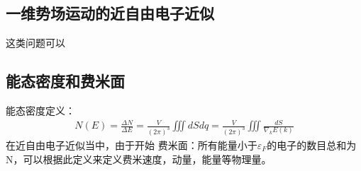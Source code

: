 \documentclass[UTF8]{article}
\numberwithin{equation}{section}
\begin{document}
\subsection{一维势场运动的近自由电子近似}
这类问题可以
\subsection{能态密度和费米面}
能态密度定义：
\begin{align*}
    N(E)=\frac{\Delta N}{\Delta E}=\frac{V}{(2\pi)^3}\iiint dSdq=\frac{V}{(2\pi)^3}\iiint \frac{dS}{\nabla_k E(k)}
\end{align*}
在近自由电子近似当中，由于开始
费米面：所有能量小于$\varepsilon_F$的电子的数目总和为N，可以根据此定义来定义费米速度，动量，能量等物理量。
\end{document}
